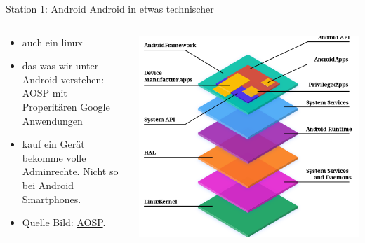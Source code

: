 \documentclass[14pt,compress,usenames,dvipsnames,aspectratio=169]{beamer}
\begin{document}
\begin{frame}{Station 1: Android}
    Android in etwas technischer
    \begin{columns}
        \begin{column}{0.5\textwidth}
            \begin{itemize}
                \item auch ein linux
                \item das was wir unter Android verstehen: AOSP mit Properitären Google Anwendungen
                \item kauf ein Gerät bekomme volle Adminrechte. Nicht so bei Android Smartphones.
                \item Quelle Bild: \href{https://source.android.com/docs/core/architecture}{AOSP}.
            \end{itemize}
        \end{column}
        \begin{column}{0.5\textwidth}  %
            \begin{center}
                \includegraphics[width=1.0\textwidth]{Screenshot from 2025-05-09 20-58-01.png}      
            \end{center}
        \end{column}
    \end{columns}


\end{frame}
\end{document}
